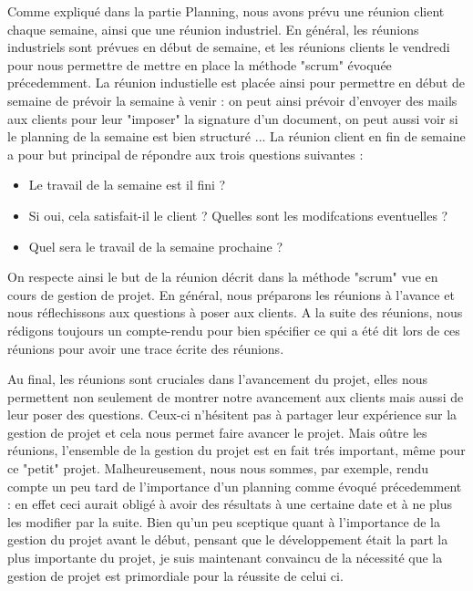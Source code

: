Comme expliqué dans la partie Planning, nous avons prévu une réunion client chaque semaine, ainsi que une réunion industriel. En général, les réunions industriels sont prévues en début de semaine,
et les réunions clients le vendredi pour nous permettre de mettre en place la méthode "scrum" évoquée précedemment. La réunion industielle est placée ainsi pour permettre en début de semaine de prévoir la semaine
à venir : on peut ainsi prévoir d'envoyer des mails aux clients pour leur "imposer" la signature d'un document, on peut aussi voir si le planning de la semaine est bien structuré ... La réunion client en fin de semaine 
a pour but principal de répondre aux trois questions suivantes :\\
\begin{itemize}
\item Le travail de la semaine est il fini ?
\item Si oui, cela satisfait-il le client ? Quelles sont les modifcations eventuelles ?
\item Quel sera le travail de la semaine prochaine ? \\
\end{itemize}

On respecte ainsi le but de la réunion décrit dans la méthode "scrum" vue en cours de gestion de projet. En général, nous préparons les réunions à l'avance et nous réflechissons aux questions à poser aux clients. 
A la suite des réunions, nous rédigons toujours un compte-rendu pour bien spécifier ce qui a été dit lors de ces réunions pour avoir une trace écrite des réunions.


	Au final, les réunions sont cruciales dans l'avancement du projet, elles nous permettent non seulement de montrer notre avancement aux clients mais aussi de leur poser des questions. Ceux-ci n'hésitent pas à partager
leur expérience sur la gestion de projet et cela nous permet faire avancer le projet. Mais oûtre les réunions, l'ensemble de la gestion du projet est en fait trés important, même pour ce "petit" projet. Malheureusement,
nous nous sommes, par exemple, rendu compte un peu tard de l'importance d'un planning comme évoqué précedemment : en effet ceci aurait obligé à avoir des résultats à une certaine date et à ne plus les modifier par la suite. 
Bien qu'un peu sceptique quant à l'importance de la gestion du projet avant le début, pensant que le développement était la part la plus importante du projet, je suis maintenant convaincu de la nécessité que la gestion de projet
est primordiale pour la réussite de celui ci.


